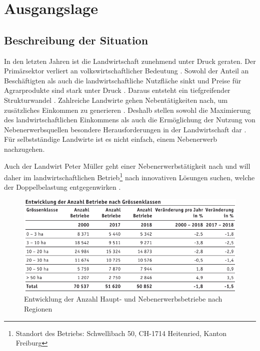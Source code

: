 

\chapter{Ausgangslage}

\section{Beschreibung der Situation }

In den letzten Jahren ist die Landwirtschaft zunehmend unter Druck geraten. Der Primärsektor verliert an volkswirtschaftlicher Bedeutung \cite[S. 1  f.]{Hofer}. Sowohl der Anteil an Beschäftigten als auch die landwirtschaftliche Nutzfläche sinkt \citep[S. 2 ]{Hofer} und Preise für Agrarprodukte sind stark unter Druck \citep[S. 11 ]{Hofer}. Daraus entsteht ein tiefgreifender Strukturwandel \cite[S. 11  f.]{Hofer}. Zahlreiche Landwirte gehen Nebentätigkeiten nach, um zusätzliches Einkommen zu generieren \citep[S. 6]{Hofer}. Deshalb stellen sowohl die Maximierung des landwirtschaftlichen Einkommens als auch die Ermöglichung der Nutzung von Nebenerwerbsquellen besondere Herausforderungen in der Landwirtschaft dar \citep[S. 8]{Stefan2003}. Für selbstständige Landwirte ist es nicht einfach, einem Nebenerwerb nachzugehen.


Auch der Landwirt Peter Müller geht einer Nebenerwerbstätigkeit nach und will daher im landwirtschaftlichen Betrieb\footnote{Standort des Betriebs: Schwellibach 50, CH-1714 Heitenried, Kanton Freiburg} nach innovativen Lösungen suchen, welche der Doppelbelastung entgegenwirken \citep{Muller2019}. \\


\begin{figure}[H]
	\center
	\includegraphics[scale=0.72]{Grafiken/Betriebsstatistik.PNG}
	\caption{Entwicklung der Anzahl Haupt- und Nebenerwerbsbetriebe nach Regionen \citep{Unbekannta}} 
	\label{fig: Entwicklung der Anzahl Haupt- und Nebenerwerbsbetriebe nach Regionen}
\end{figure}



